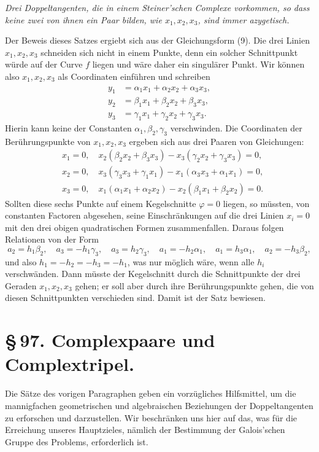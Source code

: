 \documentclass[11pt]{article}
\begin{document}
\emph{Drei Doppeltangenten, die in einem Steiner'schen Complexe vorkommen, so dass keine zwei von ihnen ein Paar bilden, wie \(x_1,x_2,x_3\), sind immer azygetisch.}

Der Beweis dieses Satzes ergiebt sich aus der Gleichungsform (9). Die drei Linien \(x_1,x_2,x_3\) schneiden sich nicht in einem Punkte, denn ein solcher Schnittpunkt würde auf der Curve \(f\) liegen und wäre daher ein singulärer Punkt. Wir können also \(x_1,x_2,x_3\) als Coordinaten einführen und schreiben
\begin{align*}
 y_1&=\alpha_1x_1+\alpha_2x_2+\alpha_3x_3,\\
 y_2&=\beta_1x_1+\beta_2x_2+\beta_3x_3,\\
 y_3&=\gamma_1x_1+\gamma_2x_2+\gamma_3x_3.
\end{align*}
Hierin kann keine der Constanten \(\alpha_1,\beta_2,\gamma_3\) verschwinden. Die Coordinaten der Berührungspunkte von \(x_1,x_2,x_3\) ergeben sich aus drei Paaren von Gleichungen:
\begin{align*}
&x_1=0,\quad x_2(\beta_2x_2+\beta_3x_3)-x_3(\gamma_2x_2+\gamma_3x_3)=0,\\
&x_2=0,\quad x_3(\gamma_3x_3+\gamma_1x_1)-x_1(\alpha_3x_3+\alpha_1x_1)=0,\\
&x_3=0,\quad x_1(\alpha_1x_1+\alpha_2x_2)-x_2(\beta_1x_1+\beta_2x_2)=0.
\end{align*}
Sollten diese sechs Punkte auf einem Kegelschnitte \(\varphi=0\) liegen, so müssten, von constanten Factoren abgesehen, seine Einschränkungen auf die drei Linien \(x_i=0\) mit den drei obigen quadratischen Formen zusammenfallen. Daraus folgen Relationen von der Form
\begin{equation}
 a_2=h_1\beta_2,
\quad a_3=-h_1\gamma_3,
\quad a_3=h_2\gamma_3,
\quad a_1=-h_2\alpha_1,
\quad a_1=h_3\alpha_1,
\quad a_2=-h_3\beta_2,
 \tag{10}
\end{equation}
und also \(h_1=-h_2=-h_3=-h_1\), was nur möglich wäre, wenn alle \(h_i\) verschwänden. Dann müsste der Kegelschnitt durch die Schnittpunkte der drei Geraden \(x_1,x_2,x_3\) gehen; er soll aber durch ihre Berührungspunkte gehen, die von diesen Schnittpunkten verschieden sind. Damit ist der Satz bewiesen.

\clearpage
\section*{\S\,97. Complexpaare und Complextripel.}

Die Sätze des vorigen Paragraphen geben ein vorzügliches Hilfsmittel, um die mannigfachen geometrischen und algebraischen Beziehungen der Doppeltangenten zu erforschen und darzustellen. Wir beschränken uns hier auf das, was für die Erreichung unseres Hauptzieles, nämlich der Bestimmung der Galois'schen Gruppe des Problems, erforderlich ist.
\end{document}
